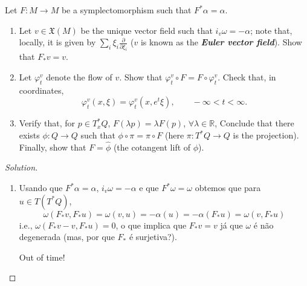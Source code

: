 Let  $F:M\to M$ be a symplectomorphism such that $F^*\alpha=\alpha$.
\begin{enumerate}[label=\alph*.]
	\item Let $v\in\mathfrak{X}(M)$ be the unique vector field such that $i_v\omega=-\alpha$; note that, locally, it is given by $\sum_{i}\xi_i\frac{\partial }{\partial \xi_i}$ ($v$ is known as the \textit{\textbf{Euler vector field}}). Show that $F_*v=v$.

	\item Let $\varphi_t^v$ denote the flow of $v$. Show that $\varphi_t^v\circ F=F\circ \varphi_t^v$. Check that, in coordinates,
		\[\varphi_t^v(x,\xi)=\varphi_t^v(x,e^t\xi),\qquad -\infty<t<\infty.\]

	\item Verify that, for $p\in T_x^*Q$, $F(\lambda p)=\lambda F(p)$, $\forall \lambda\in\mathbb{R}$, Conclude that there exists $\phi:Q\to Q$ such that $\phi\circ \pi=\pi\circ F$ (here $\pi:T^*Q\to Q$ is the projection). Finally, show that $F=\hat{\phi}$ (the cotangent lift of $\phi$).
\end{enumerate}

\begin{proof}[Solution]\leavevmode
	\begin{enumerate}[label=\alph*.]
		\item 
			\iffalse Seguindo a nota\c c\~ao do problema anterior, se $v$  \'e um vetor tangente a $\xi$ (isso implica que $F_*v$ \'e tangente a $F\xi$), temos que
			\begin{align*}
			(F^*\alpha)v&=\alpha(F_*v)=\pi^*_{\xi}F\xi(F_*v)=F\xi(\pi_*F_*v)
			\end{align*}
			mas como $F^*\alpha=\alpha$, e por defini\c c\~ao $\alpha(v)=\xi(\pi_*v)$, temos que
			\[F\xi(\pi_*F_*v)=\xi(\pi_*v).\]
			Como $i_V\omega=-\alpha$,
			\begin{align*}
				-\xi(\pi_*v)&=-\alpha(v)=\omega(v,v)\\
				-F\xi(\pi_*F_*v)&=-\alpha(F_*v)=\omega(v,F_*v)
			\end{align*}
		\fi
		Usando que $F^*\alpha=\alpha$, $i_v\omega=-\alpha$ e que $F^*\omega=\omega$ obtemos que para  $u\in T(T^*Q)$,
			\[\omega(F_*v,F_*u)=\omega(v,u)=-\alpha(u)=-\alpha(F_*u)=\omega(v,F_*u)\]
			i.e., $\omega(F_*v-v,F_*u)=0$, o que implica que $F_*v=v$ j\'a que $\omega$ \'e n\~ao degenerada (mas, por que $F_*$ \'e surjetiva?).

	{\color{magenta}Out of time!}

	\end{enumerate}
\end{proof}

